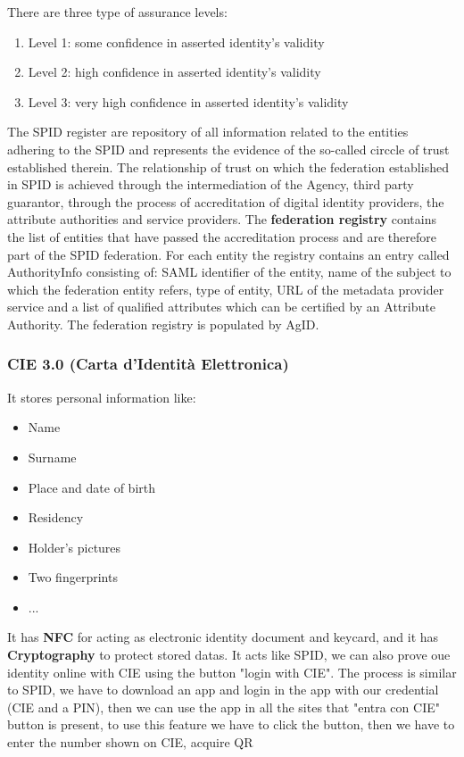 There are three type of assurance levels:
\begin{enumerate}
    \item Level 1: some confidence in asserted identity's validity
    \item Level 2: high confidence in asserted identity's validity
    \item Level 3: very high confidence in asserted identity's validity
\end{enumerate}

The SPID register are repository of all information related to the entities adhering to the SPID and represents the evidence of the so-called circcle of trust established therein. The relationship of trust on which the federation established  in SPID is achieved through the intermediation of the Agency, third party guarantor, through the process of accreditation of digital identity providers, the attribute authorities and service providers. The \textbf{federation registry} contains the list of entities that have passed the accreditation process and are therefore part of the SPID federation. For each entity the registry contains an entry called AuthorityInfo consisting of: SAML identifier of the entity, name of the subject to which the federation entity refers, type of entity, URL of the metadata provider service and a list of qualified attributes which can be certified by an Attribute Authority. The federation registry is populated by AgID.

\subsubsection{CIE 3.0 (Carta d'Identità Elettronica)}
It stores personal information like:
\begin{itemize}
    \item Name
    \item Surname
    \item Place and date of birth
    \item Residency
    \item Holder's pictures
    \item Two fingerprints
    \item ...
\end{itemize}
It has \textbf{NFC} for acting as electronic identity document and keycard, and it has \textbf{Cryptography} to protect stored datas. It acts like SPID, we can also prove oue identity online with CIE using the button "login with CIE". The process is similar to SPID, we have to download an app and login in the app with our credential (CIE and a PIN), then we can use the app in all the sites that "entra con CIE" button is present, to use this feature we have to click the button, then we have to enter the number shown on CIE, acquire QR 

